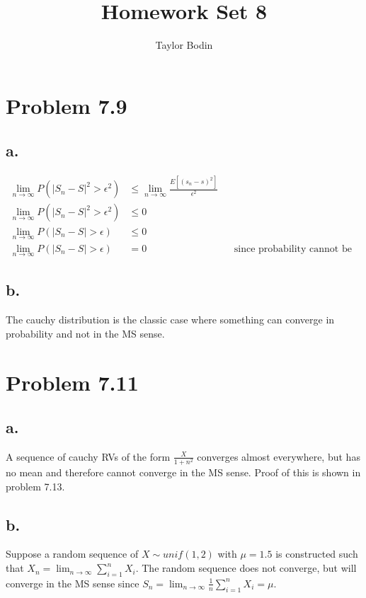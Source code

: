 \documentclass[12pt]{article}
\begin{document}
\title{Homework Set 8}
\author{Taylor Bodin}
\maketitle

\section{Problem 7.9}
\subsection{a.}
\begin{align*}
  \lim_{n\to\infty} P\left( |S_n-S|^2 > \epsilon^2 \right) &\leq \lim_{n\to\infty} \frac{E[(s_n-s)^2]}{\epsilon^2} \\
  \lim_{n\to\infty} P\left( |S_n-S|^2 > \epsilon^2 \right) &\leq 0 \\
  \lim_{n\to\infty} P\left( |S_n-S| > \epsilon \right) &\leq 0 \\
  \lim_{n\to\infty} P\left( |S_n-S| > \epsilon \right) &= 0 & & \textrm{since probability cannot be negative.}
\end{align*}

\subsection{b.}
The cauchy distribution is the classic case where something can converge in probability and not in the MS sense. 

\section{Problem 7.11}
\subsection{a.}
A sequence of cauchy RVs of the form $\frac{X}{1+n^2}$ converges almost everywhere, but has no mean and therefore
cannot converge in the MS sense. Proof of this is shown in problem 7.13.

\subsection{b.}
Suppose a random sequence of $X\sim unif(1,2)$ with $\mu = 1.5$ is constructed such that 
$X_n = \lim_{n\to\infty} \sum_{i=1}^n X_i$. The random sequence does not converge, but will
converge in the MS sense since $S_n = \lim_{n\to\infty} \frac{1}{n} \sum_{i=1}^n X_i = \mu$. 
\end{document}
